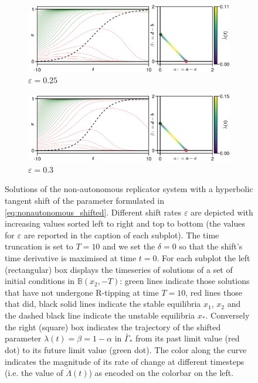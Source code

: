 \documentclass[../main.tex]{subfiles}
\begin{document}
\begin{figure}[H]
    \begin{subfigure}[b]{0.495\textwidth}
        \centering 
        \includegraphics[keepaspectratio, width = \linewidth]{../figures/fig:nonautonomous_3.png}
        \caption{$\varepsilon = 0.25$}
        \label{fig:nonautonomous_3}
    \end{subfigure}
    \hfill
    \begin{subfigure}[b]{0.495\textwidth}
        \centering 
        \includegraphics[keepaspectratio, width = \linewidth]{../figures/fig:nonautonomous_4.png}
        \caption{$\varepsilon = 0.3$}
        \label{fig:nonautonomous_4}
    \end{subfigure}

    \caption{Solutions of the non-autonomous replicator system with a hyperbolic tangent shift of the parameter formulated in \eqref{eq:nonautonomous_shifted}.
            Different shift rates $\varepsilon$ are depicted with increasing values sorted left to right and top to bottom (the values for $\varepsilon$ are reported in the caption of each subplot).
            The time truncation is set to $T=10$ and we set the $\delta=0$ so that the shift's time derivative is maximised at time $t=0$.
            For each subplot the left (rectangular) box displays the timeseries of solutions of a set of initial conditions in $\mathbb{B}(x_{2},-T)$: green lines indicate those solutions that have not undergone R-tipping at time $T=10$, red lines those that did, black solid lines indicate the stable equilibria $x_{1}$, $x_{2}$ and the dashed black line indicate the unstable equilibria $x_{*}$.
            Conversely the right (square) box indicates the trajectory of the shifted parameter $\lambda(t) = \beta = 1 - \alpha$ in $\tilde{\Gamma_{*}}$ from its past limit value (red dot) to its future limit value (green dot). 
            The color along the curve indicates the magnitude of its rate of change at different timesteps (i.e. the value of $\dot{\Lambda}(t)$) as encoded on the colorbar on the left.
    }
    \label{fig:nonautonomous}
\end{figure}
\end{document}
